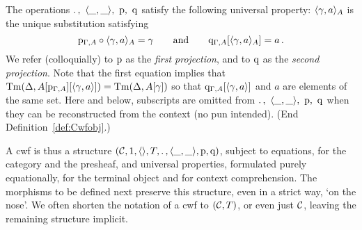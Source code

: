 \documentclass{lmcs}
\begin{document}
\begin{definition}
The operations  ${.\,},~\langle \_,\_ \rangle,~\mathrm{p},~\mathrm{q}$
satisfy the following universal property:
$\langle \gamma, a \rangle_A$ is the unique substitution satisfying
\[
\mathrm{p}_{\Gamma, A} \circ \langle \gamma, a \rangle_A = \gamma
\qquad \text{and}\qquad
\mathrm{q}_{\Gamma, A} [\langle \gamma, a \rangle_A] = a\,.
\]
We refer (colloquially) to $\mathrm{p}$ as the \emph{first projection},
and to $\mathrm{q}$ as the \emph{second projection}. %
{Note that the first equation implies that
$\mathrm{Tm}(\Delta,A[\mathrm{p}_{\Gamma,A}][\langle \gamma, a \rangle]) = \mathrm{Tm}(\Delta,A[\gamma])$
so that $\mathrm{q}_{\Gamma, A} [\langle \gamma, a \rangle]$ and $a$ are elements of the same set.}
Here and below, subscripts are omitted from ${.\,},~\langle \_,\_ \rangle,~\mathrm{p},~\mathrm{q}$
when they can be reconstructed from the context (no pun intended).
(End Definition~\ref{def:Cwfobj}.)
\end{definition}

A cwf is thus a structure $({\mathcal C},1,\langle  \rangle,T,.\, , \langle \_,\_ \rangle,\mathrm{p}, \mathrm{q})$,
subject to equations, for the category and the presheaf, and universal
properties, formulated purely equationally, for the terminal object and for context comprehension.
The morphisms to be defined next preserve this structure,
even in a strict way, `on the nose'.
We often shorten the notation of a cwf to $({\mathcal C},T)$, or even just ${\mathcal C}$,
leaving the remaining structure implicit.
\end{document}
